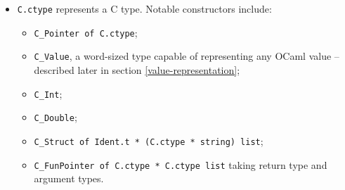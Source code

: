 \documentclass[12pt,a4paper,twoside,openright]{report}
\begin{document}
\begin{itemize}
  \item
    \lstinline!C.ctype! represents a C type. Notable constructors include:

    \begin{itemize}
        \item \lstinline!C_Pointer of C.ctype!;
        \item \lstinline!C_Value!, a word-sized type capable of representing
          any OCaml value -- described later in section \ref{value-representation};
        \item \lstinline!C_Int!;
        \item \lstinline!C_Double!;
        \item \lstinline!C_Struct of Ident.t * (C.ctype * string) list!;
        \item \lstinline!C_FunPointer of C.ctype * C.ctype list! taking return
            type and argument types.
    \end{itemize}


\end{itemize}
\end{document}
